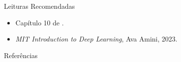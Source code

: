 \documentclass[aspectratio=169,xcolor=dvipsnames]{beamer}
\begin{document}
\begin{frame}{Leituras Recomendadas}
    \leiturasize
    \begin{itemize}
        \item Capítulo 10 de .
        \item \textit{MIT Introduction to Deep Learning}, Ava Amini, 2023.
    \end{itemize}
\end{frame}

\begin{frame}[allowframebreaks]{Referências}
    \sloppy
    \printbibliography[heading=none]
\end{frame}
\end{document}
